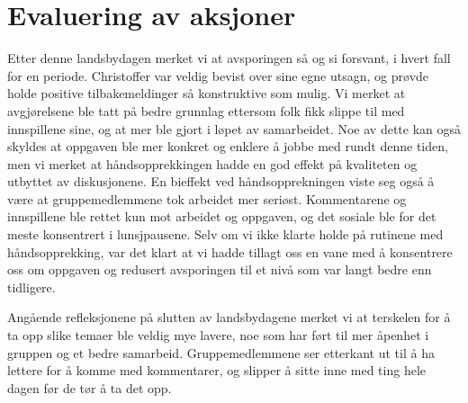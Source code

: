 \section{Evaluering av aksjoner}

Etter denne landsbydagen merket vi at avsporingen så og si forsvant, i hvert fall for en periode. Christoffer var veldig bevist over sine egne utsagn, og prøvde holde positive tilbakemeldinger så konstruktive som mulig. Vi merket at avgjørelsene ble tatt på bedre grunnlag ettersom folk fikk slippe til med innspillene sine, og at mer ble gjort i løpet av samarbeidet. Noe av dette kan også skyldes at oppgaven ble mer konkret og enklere å jobbe med rundt denne tiden, men vi merket at håndsopprekkingen hadde en god effekt på kvaliteten og utbyttet av diskusjonene. En bieffekt ved håndsopprekningen viste seg også å være at gruppemedlemmene tok arbeidet mer seriøst. Kommentarene og innspillene ble rettet kun mot arbeidet og oppgaven, og det sosiale ble for det meste konsentrert i lunsjpausene. Selv om vi ikke klarte holde på rutinene med håndsopprekking, var det klart at vi hadde tillagt oss en vane med å konsentrere oss om oppgaven og redusert avsporingen til et nivå som var langt bedre enn tidligere.

Angående refleksjonene på slutten av landsbydagene merket vi at terskelen for å ta opp slike temaer ble veldig mye lavere, noe som har ført til mer åpenhet i gruppen og et bedre samarbeid. Gruppemedlemmene ser etterkant ut til å ha lettere for å komme med kommentarer, og slipper å sitte inne med ting hele dagen før de tør å ta det opp.



